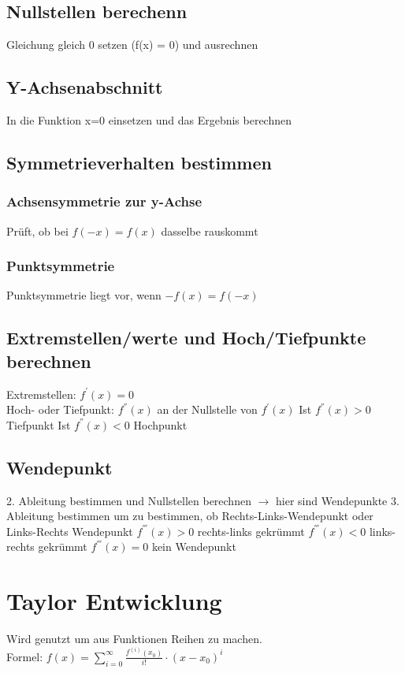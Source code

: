 \documentclass[12pt,a4paper]{article}
\begin{document}
	\subsection{Nullstellen berechenn}
		Gleichung gleich 0 setzen (f(x) = 0) und ausrechnen

	\subsection{Y-Achsenabschnitt}
		In die Funktion x=0 einsetzen und das Ergebnis berechnen

	\subsection{Symmetrieverhalten bestimmen}
		\subsubsection{Achsensymmetrie zur y-Achse}
			Prüft, ob bei $f(-x)=f(x)$ dasselbe rauskommt
		\subsubsection{Punktsymmetrie}
			Punktsymmetrie liegt vor, wenn $-f(x)=f(-x)$

	\subsection{Extremstellen/werte und Hoch/Tiefpunkte berechnen}
		Extremstellen: $f^{'}(x) = 0$\\
		Hoch- oder Tiefpunkt: $f^{''}(x)$ an der Nullstelle von $f^{'}(x)$ 
			Ist $f^{''}(x)>0$ Tiefpunkt
			Ist $f^{''}(x)<0$ Hochpunkt

	\subsection{Wendepunkt}
		2. Ableitung bestimmen und Nullstellen berechnen $\rightarrow$ hier sind Wendepunkte
		3. Ableitung bestimmen um zu bestimmen, ob Rechts-Links-Wendepunkt oder Links-Rechts Wendepunkt 
			$f^{'''}(x)>0$ rechts-links gekrümmt 
			$f^{'''}(x)<0$ links-rechts gekrümmt
			$f^{'''}(x)=0$ kein Wendepunkt

\section{Taylor Entwicklung}
	Wird genutzt um aus Funktionen Reihen zu machen.\\ 
	Formel: $f(x) = \sum_{i = 0}^{\infty} \frac{f^{(i)}(x_0)}{i!} \cdot (x-x_0)^i$
\end{document}
